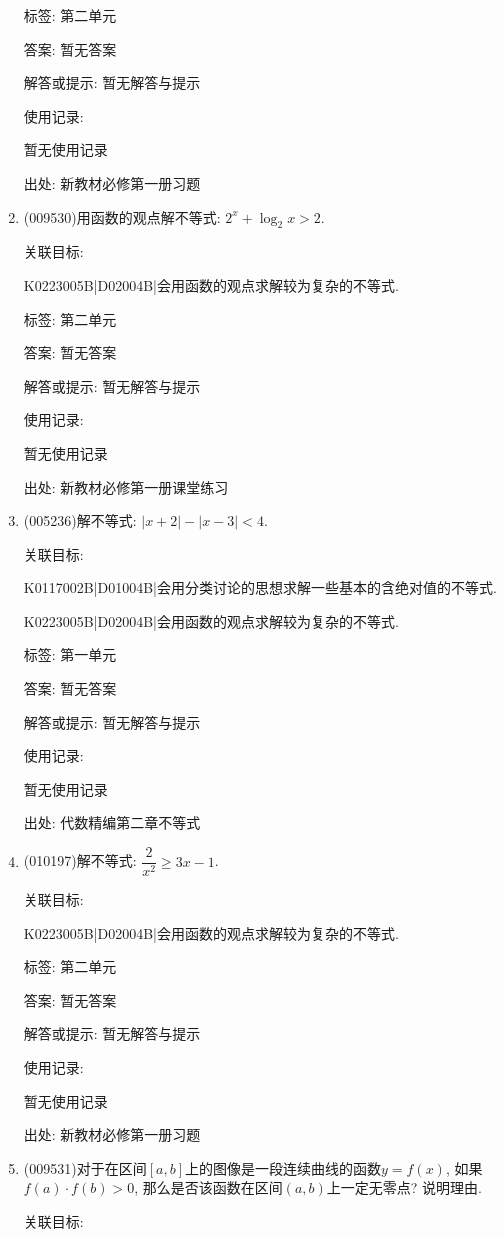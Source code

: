 \documentclass[10pt,a4paper]{article}
\begin{document}
\begin{enumerate}[1.]
标签: 第二单元

答案: 暂无答案

解答或提示: 暂无解答与提示

使用记录:

暂无使用记录


出处: 新教材必修第一册习题
\item { (009530)}用函数的观点解不等式: $2^x+\log_2x>2$.


关联目标:

K0223005B|D02004B|会用函数的观点求解较为复杂的不等式.



标签: 第二单元

答案: 暂无答案

解答或提示: 暂无解答与提示

使用记录:

暂无使用记录


出处: 新教材必修第一册课堂练习
\item { (005236)}解不等式: $|x+2|-|x-3|<4$.


关联目标:

K0117002B|D01004B|会用分类讨论的思想求解一些基本的含绝对值的不等式.

K0223005B|D02004B|会用函数的观点求解较为复杂的不等式.



标签: 第一单元

答案: 暂无答案

解答或提示: 暂无解答与提示

使用记录:

暂无使用记录


出处: 代数精编第二章不等式
\item { (010197)}解不等式: $\dfrac 2{x^2}\ge 3x-1$.


关联目标:

K0223005B|D02004B|会用函数的观点求解较为复杂的不等式.



标签: 第二单元

答案: 暂无答案

解答或提示: 暂无解答与提示

使用记录:

暂无使用记录


出处: 新教材必修第一册习题
\item { (009531)}对于在区间$[a, b]$上的图像是一段连续曲线的函数$y=f(x)$, 如果$f(a)\cdot f(b)>0$, 那么是否该函数在区间$(a, b)$上一定无零点? 说明理由.


关联目标:


\end{enumerate}
\end{document}
